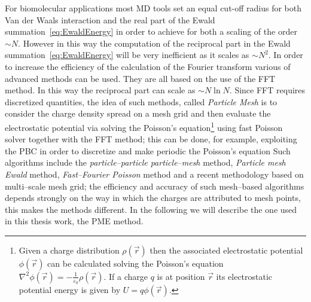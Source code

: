 For biomolecular applications most \ac{MD} tools set an equal cut-off radius for both Van der Waals interaction and the real part of the Ewald summation~\eqref{eq:EwaldEnergy} in order to achieve for both a scaling of the order $\sim N$. However in this way the computation of the reciprocal part in the Ewald summation~\eqref{eq:EwaldEnergy} will be very inefficient as it scales as $\sim N^2$. In order to increase the efficiency of the calculation of the Fourier transform various of advanced methods can be used. They are all based on the use of the \ac{FFT} method. In this way the reciprocal part can scale as $\sim N\ln N$. Since \ac{FFT} requires discretized quantities, the idea of such methods, called \textit{Particle Mesh} is to consider the charge density spread on a mesh grid and then evaluate the electrostatic potential via solving the Poisson's equation\footnote{Given a charge distribution $\rho(\vec r)$ then the associated electrostatic potential $\phi(\vec r)$ can be calculated solving the Poisson's equation $\displaystyle \nabla^2\phi(\vec r) = -\frac{1}{\varepsilon_0} \rho(\vec r)$. If a charge $q$ is at position $\vec r$ its electrostatic potential energy is given by $U = q\phi(\vec r)$.}
using fast Poisson solver together with the \ac{FFT} method; this can be done, for example, exploiting the \ac{PBC} in order to discretize and make periodic the Poisson's equation
Such algorithms include the \textit{particle--particle particle--mesh} method, \textit{Particle mesh Ewald} method, \textit{Fast--Fourier Poisson} method and a recent methodology based on multi--scale mesh grid; the efficiency and accuracy of such mesh--based algorithms depends strongly on the way in which the charges are attributed to mesh points, this makes the methods different. In the following we will describe the one used in this thesis work, the \acf{PME} method.

